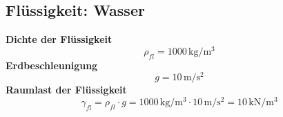 \documentclass[11pt,a4paper]{article}
\begin{document}
\subsection{Flüssigkeit: Wasser}
\noindent\textbf{Dichte der Flüssigkeit}
\begin{equation*}
\rho_{fl} = 1000\,\mathrm{kg}/\mathrm{m}^{3}
\end{equation*}
\noindent\textbf{Erdbeschleunigung}
\begin{equation*}
g = 10\,\mathrm{m}/\mathrm{s}^{2}
\end{equation*}
\noindent\textbf{Raumlast der Flüssigkeit}
\begin{equation*}
\gamma_{fl} = \rho_{fl} \cdot g = 1000\,\mathrm{kg}/\mathrm{m}^{3} \cdot 10\,\mathrm{m}/\mathrm{s}^{2} = 10\,\mathrm{kN}/\mathrm{m}^{3}
\end{equation*}
\end{document}
